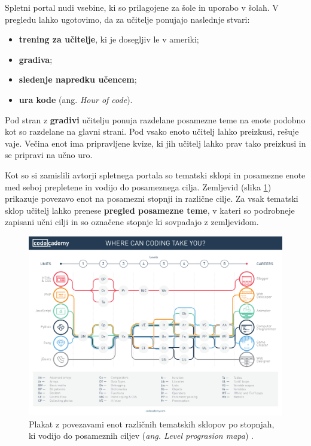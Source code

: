 Spletni portal nudi vsebine, ki so prilagojene za šole in uporabo v
šolah. V pregledu lahko ugotovimo, da za učitelje ponujajo naslednje
stvari:

\begin{itemize}
\item \textbf{trening za učitelje}, ki je dosegljiv le v ameriki;
\item \textbf{gradiva};
\item \textbf{sledenje napredku učencem};
\item \textbf{ura kode} (ang. \emph{Hour of code}).
\end{itemize}

Pod stran z \textbf{ gradivi} %
učitelju ponuja razdelane posamezne teme na enote podobno kot so
razdelane na glavni strani. Pod vsako enoto učitelj lahko preizkusi,
rešuje vaje. Večina enot ima pripravljene kvize, ki jih učitelj lahko
prav tako preizkusi in se pripravi na učno uro.



Kot so si zamislili avtorji spletnega portala so tematski sklopi in
posamezne enote med seboj prepletene in vodijo do posameznega
cilja. Zemljevid (slika \ref{fig:codeacademy:poster}) prikazuje
povezavo enot na posamezni stopnji in različne cilje. Za vsak tematski
sklop učitelj lahko prenese \textbf{pregled posamezne teme}, v kateri
so podrobneje zapisani učni cilji in so označene stopnje ki sovpadajo
z zemljevidom.

\begin{figure}[h!]
  \centering
    \includegraphics [width=1\linewidth, keepaspectratio =
   1] {./images/CAdemy-poster.pdf}
   \caption{Plakat z povezavami enot različnih tematskih sklopov po
     stopnjah, ki vodijo  do posameznih ciljev (\emph{ang. Level
       prograsion mapa}) \cite{web:codeacademy}.}
    \label{fig:codeacademy:poster}
\end{figure}

